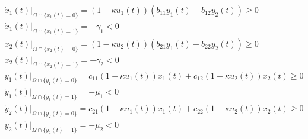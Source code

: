\begin{equation}
  \begin{split}
    &\dot{x}_1(t)\vert_{\Omega \cap \{x_1(t)=0\}} = (1-\kappa u_1(t))(b_{11} y_1(t) + b_{12} y_2(t)) \geq 0 \\
    &\dot{x}_1(t)\vert_{\Omega \cap \{x_1(t)=1\}} = - \gamma_1 < 0 \\
    &\dot{x}_2(t)\vert_{\Omega \cap \{x_2(t)=0\}} = (1-\kappa u_2(t))(b_{21} y_1(t) + b_{22} y_2(t)) \geq 0 \\
    &\dot{x}_2(t)\vert_{\Omega \cap \{x_2(t)=1\}} = - \gamma_2 < 0 \\
    &\dot{y}_1(t)\vert_{\Omega \cap \{y_1(t)=0\}} = c_{11}(1-\kappa u_1(t)) x_1(t) + c_{12}(1-\kappa u_2(t)) x_2(t) \geq 0 \\
    &\dot{y}_1(t)\vert_{\Omega \cap \{y_1(t)=1\}} = - \mu_1 < 0 \\
    &\dot{y}_2(t)\vert_{\Omega \cap \{y_2(t)=0\}} = c_{21}(1-\kappa u_1(t)) x_1(t) + c_{22}(1-\kappa u_2(t)) x_2(t) \geq 0 \\
    &\dot{y}_2(t)\vert_{\Omega \cap \{y_2(t)=1\}} = - \mu_2 < 0
  \end{split}
\end{equation}

